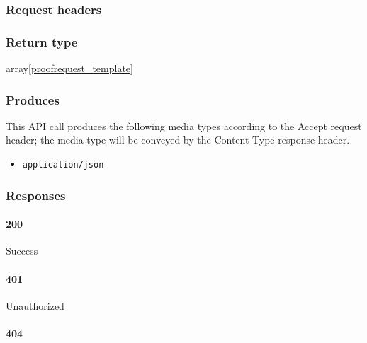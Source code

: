 \hypertarget{request-headers-56}{%
\subsubsection{Request headers}\label{request-headers-56}}

\hypertarget{return-type-81}{%
\subsubsection{Return type}\label{return-type-81}}

array{[}\protect\hyperlink{proofrequest_template}{proofrequest\_template}{]}

\hypertarget{produces-102}{%
\subsubsection{Produces}\label{produces-102}}

This API call produces the following media types according to the
{Accept} request header; the media type will be conveyed by the
{Content-Type} response header.

\begin{itemize}
\tightlist
\item
  \texttt{application/json}
\end{itemize}

\hypertarget{responses-104}{%
\subsubsection{Responses}\label{responses-104}}

\hypertarget{section-342}{%
\paragraph{200}\label{section-342}}

Success

\hypertarget{section-343}{%
\paragraph{401}\label{section-343}}

Unauthorized \protect\hyperlink{}{}

\hypertarget{section-344}{%
\paragraph{404}\label{section-344}}

